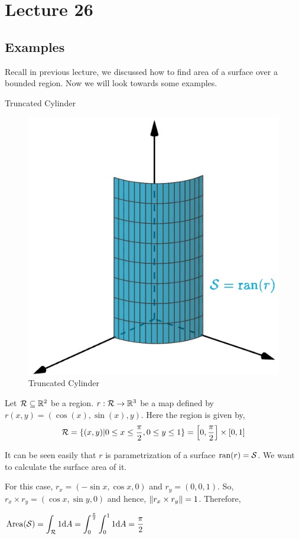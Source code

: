 \documentclass[../Analysis-3]{subfiles}
\begin{document}
\chapter*{Lecture 26} %
\setcounter{chapter}{26} %
\setcounter{section}{0}

\section{Examples}
Recall in previous lecture, we discussed how to find area of a surface over a bounded region. Now we will look towards some examples.

\begin{Eg}{Truncated Cylinder}{}

    \begin{figure}
        \centering
        \includegraphics[width=.78\linewidth]{../figures/lec-26.1.png}
        \caption{Truncated Cylinder}
    \end{figure}

    Let $\mathcal{R} \subseteq \mathbb{R}^2$ be a region. $r : \mathcal{R} \to \mathbb{R}^3$ be a map defined by $r(x,y) = (\cos(x),\sin(x),y)$. Here the region is given by,
    \[\mathcal{R} = \{(x,y) | 0 \le x \le \frac{\pi}{2}, 0\le y \le 1\} = \qty[0,\frac{\pi}{2}] \times [0,1] \]

    It can be seen easily that $r$ is parametrization of a surface $\operatorname{ran}(r) = \mathcal{S}$. We want to calculate the surface area of it.

    For this case, $r_x = (-\sin x, \cos x, 0)$ and $r_y =(0,0,1)$. So, $ r_x \times r_y = (\cos x, \sin y, 0)$ and hence, $\norm{r_x \times r_y} = 1$. Therefore,

    $\displaystyle \operatorname{Area}(\mathcal{S}) = \int_{\mathcal{R}} 1 \dd A = \int_0^{\frac{\pi}{2}} \int_{0}^1 1 \dd A = \frac{\pi}{2}$

\end{Eg}
\end{document}
